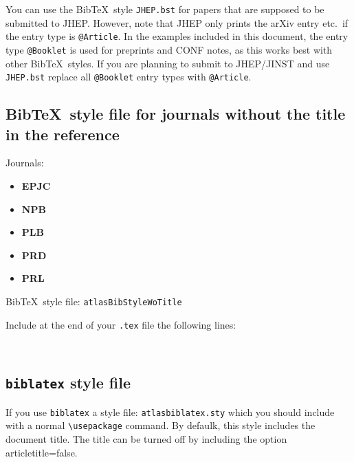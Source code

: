 \documentclass[UKenglish]{latex/atlasdoc}
\newcommand*{\BibTeX}{Bib\TeX}
\newcommand{\File}[1]{\texttt{#1}\xspace}
\newcommand{\Macro}[1]{\texttt{\textbackslash #1}\xspace}
\newcommand{\Option}[1]{\textsf{#1}\xspace}
\newcommand{\Package}[1]{\texttt{#1}\xspace}
\begin{document}
You can use the \BibTeX\ style \File{JHEP.bst} for papers that are supposed to be submitted to JHEP.
However, note that JHEP only prints the arXiv entry etc.\ if the entry type is \texttt{@Article}.
In the examples included in this document,
the entry type \texttt{@Booklet} is used for preprints and CONF notes,
as this works best with other \BibTeX\ styles.
If you are planning to submit to JHEP/JINST and use \File{JHEP.bst} 
replace all \texttt{@Booklet} entry types with \texttt{@Article}.


\subsection{\BibTeX\ style file for journals without the title in the reference}
\label{sec:wotitle}

Journals:
\begin{itemize}\setlength{\parskip}{0pt}\setlength{\itemsep}{0pt}
\item \textbf{EPJC}
\item \textbf{NPB}
\item \textbf{PLB}
\item \textbf{PRD}
\item \textbf{PRL}
\end{itemize}
%
\BibTeX\ style file: \Package{atlasBibStyleWoTitle}

\noindent Include at the end of your \File{.tex} file the following lines:
\begin{verbatim}


\end{verbatim}


\subsection{\Package{biblatex} style file}

If you use \Package{biblatex} a style file: \Package{atlasbiblatex.sty}
which you should include with a normal \Macro{usepackage} command.
By defaulk, this style includes the document title.
The title can be turned off by including the option \Option{articletitle=false}.


\end{document}
